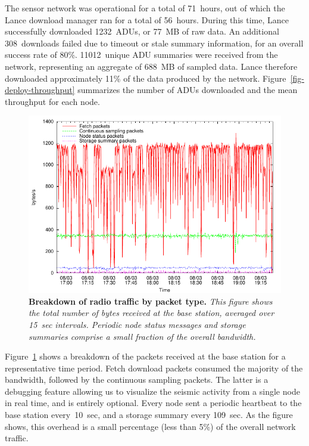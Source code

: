 The sensor network was operational for a total of 71~hours, out of
which the Lance download manager ran for a total of 56~hours. 
During this time, Lance successfully downloaded 1232~ADUs, or 77~MB of 
raw data. An additional 308~downloads failed due to timeout or stale summary 
information, for an overall success rate of 80\%. 
11012~unique ADU summaries were received from the network,
representing an aggregate of 688~MB of sampled data. Lance therefore
downloaded approximately 11\% of the data produced by the network.
Figure~\ref{fig-deploy-throughput} summarizes the number of ADUs
downloaded and the mean throughput for each node. 


\begin{figure}[t]
\begin{center}
\includegraphics[width=0.9\hsize]{./lance/figs/deploy/packetgraph/packetgraph.pdf}
\end{center}
\caption{\small {\bf Breakdown of radio traffic by packet type.}
{\em This figure shows the total number of bytes received at the base 
station, averaged over 15~sec intervals. Periodic node status messages
and storage summaries comprise a small fraction of the overall
bandwidth.}}
\label{fig-packetgraph}
\end{figure}

Figure~\ref{fig-packetgraph} shows a breakdown of the packets received
at the base station for a representative time period.
Fetch download packets consumed the majority of
the bandwidth, followed by the continuous sampling packets.
The latter is a debugging feature allowing us to visualize the
seismic activity from a single node in real time, and is entirely optional.
Every node sent a periodic heartbeat to the base station every~10~sec,
and a storage summary every 109~sec. As the figure shows, this
overhead is a small percentage (less than 5\%) of the overall network
traffic. 


